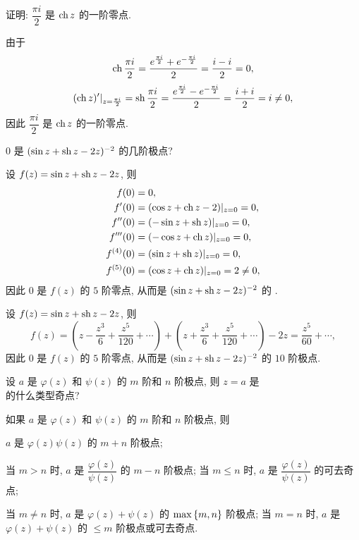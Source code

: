 \begin{exercise}
	证明: $\dfrac{\pi i}2$ 是 $\operatorname{ch} z$ 的一阶零点.
\end{exercise}
\begin{solution}[证明]
	由于
	\[\operatorname{ch}\frac{\pi i}2=\frac{e^{\frac{\pi i}2}+e^{-\frac{\pi i}2}}2
	=\frac{i-i}2=0,\]
	\[(\operatorname{ch} z)'|_{z=\frac{\pi i}2}=\operatorname{sh}\frac{\pi i}2=\frac{e^{\frac{\pi i}2}-e^{-\frac{\pi i}2}}2
	=\frac{i+i}2=i\neq 0,\]
	因此 $\dfrac{\pi i}2$ 是 $\operatorname{ch} z$ 的一阶零点.
\end{solution}


\begin{exercise}
	$0$ 是 $(\sin z+\operatorname{sh} z-2z)^{-2}$ 的几阶极点?
\end{exercise}
\begin{solution}
	设 $f(z)=\sin z+\operatorname{sh} z-2z$, 则
	\begin{align*}
		f(0)&=0,\\
		f'(0)&=(\cos z+\operatorname{ch} z-2)|_{z=0}=0,\\
		f''(0)&=(-\sin z+\operatorname{sh} z)|_{z=0}=0,\\
		f'''(0)&=(-\cos z+\operatorname{ch} z)|_{z=0}=0,\\
		f^{(4)}(0)&=(\sin z+\operatorname{sh} z)|_{z=0}=0,\\
		f^{(5)}(0)&=(\cos z+\operatorname{ch} z)|_{z=0}=2\neq0,
	\end{align*}
	因此 $0$ 是 $f(z)$ 的 $5$ 阶零点, 从而是 $(\sin z+\operatorname{sh} z-2z)^{-2}$ 的 .
\end{solution}
\begin{solution}[另解]
	设 $f(z)=\sin z+\operatorname{sh} z-2z$, 则
	\[f(z)=\left(z-\frac{z^3}{6}+\frac{z^5}{120}+\cdots\right)
	+\left(z+\frac{z^3}{6}+\frac{z^5}{120}+\cdots\right)-2z
	=\frac{z^5}{60}+\cdots,\]
	因此 $0$ 是 $f(z)$ 的 $5$ 阶零点, 从而是 $(\sin z+\operatorname{sh} z-2z)^{-2}$ 的 $10$ 阶极点.
\end{solution}


\begin{exercise}[3]
	设 $a$ 是 $\varphi(z)$ 和 $\psi(z)$ 的 $m$ 阶和 $n$ 阶极点, 则 $z=a$ 是
	\\
	的什么类型奇点?
\end{exercise}
\begin{solution}
	如果 $a$ 是 $\varphi(z)$ 和 $\psi(z)$ 的 $m$ 阶和 $n$ 阶极点, 则

	\subex $a$ 是 $\varphi(z)\psi(z)$ 的 $m+n$ 阶极点;

	\subex 当 $m>n$ 时, $a$ 是 $\dfrac{\varphi(z)}{\psi(z)}$ 的 $m-n$ 阶极点; 当 $m\le n$ 时, $a$ 是 $\dfrac{\varphi(z)}{\psi(z)}$ 的可去奇点;

	\subex 当 $m\neq n$ 时, $a$ 是 $\varphi(z)+\psi(z)$ 的 $\max{\left\{m,n\right\}}$ 阶极点; 当 $m=n$ 时, $a$ 是 $\varphi(z)+\psi(z)$ 的 $\le m$ 阶极点或可去奇点.
\end{solution}


